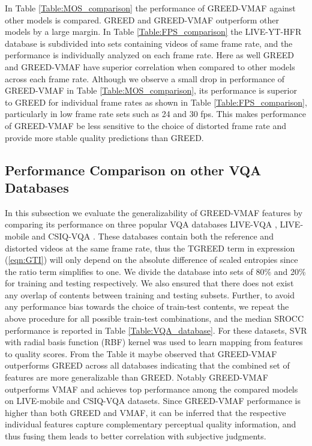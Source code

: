 \documentclass[conference]{IEEEtran}
\begin{document}
In Table \ref{Table:MOS_comparison} the performance of GREED-VMAF against other models is compared. GREED and GREED-VMAF outperform other models by a large margin. In Table \ref{Table:FPS_comparison} the LIVE-YT-HFR database is subdivided into sets containing videos of same frame rate, and the performance is individually analyzed on each frame rate. Here as well GREED and GREED-VMAF have superior correlation when compared to other models across each frame rate. Although we observe a small drop in performance of GREED-VMAF in Table \ref{Table:MOS_comparison}, its performance is superior to GREED for individual frame rates as shown in Table \ref{Table:FPS_comparison}, particularly in low frame rate sets such as 24 and 30 fps. This makes performance of GREED-VMAF be less sensitive to the choice of distorted frame rate and provide more stable quality predictions than GREED.

\subsection{Performance Comparison on other VQA Databases}
In this subsection we evaluate the generalizability of GREED-VMAF features by comparing its performance on three popular VQA databases LIVE-VQA \cite{seshadrinathan2010study}, LIVE-mobile \cite{moorthy2012video} and CSIQ-VQA \cite{vu2014vis3}. These databases contain both the reference and distorted videos at the same frame rate, thus the TGREED term in expression (\ref{eqn:GTI}) will only depend on the absolute difference of scaled entropies since the ratio term simplifies to one. We divide the database into sets of 80\% and 20\% for training and testing respectively. We also ensured that there does not exist any overlap of contents between training and testing subsets. Further, to avoid any performance bias towards the choice of train-test contents, we repeat the above procedure for all possible train-test combinations, and the median SROCC performance is reported in Table \ref{Table:VQA_database}. For these datasets, SVR with radial basis function (RBF) kernel was used to learn mapping from features to quality scores. From the Table it maybe observed that GREED-VMAF outperforms GREED across all databases indicating that the combined set of features are more generalizable than GREED. Notably GREED-VMAF outperforms VMAF and achieves top performance among the compared models on LIVE-mobile and CSIQ-VQA datasets. Since GREED-VMAF performance is higher than both GREED and VMAF, it can be inferred that the respective individual features capture complementary perceptual quality information, and thus fusing them leads to better correlation with subjective judgments.
\end{document}
